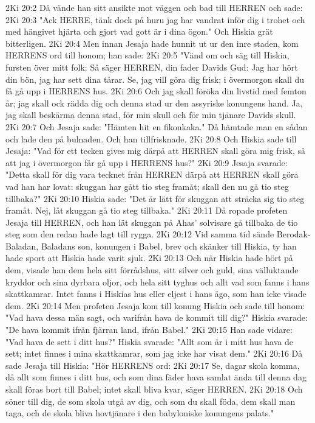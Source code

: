 2Ki 20:2  Då vände han sitt ansikte mot väggen och bad till HERREN och sade:
2Ki 20:3  "Ack HERRE, tänk dock på huru jag har vandrat inför dig i trohet och med hängivet hjärta och gjort vad gott är i dina ögon." Och Hiskia grät bitterligen.
2Ki 20:4  Men innan Jesaja hade hunnit ut ur den inre staden, kom HERRENS ord till honom; han sade:
2Ki 20:5  "Vänd om och säg till Hiskia, fursten över mitt folk: Så säger HERREN, din fader Davids Gud: Jag har hört din bön, jag har sett dina tårar. Se, jag vill göra dig frisk; i övermorgon skall du få gå upp i HERRENS hus.
2Ki 20:6  Och jag skall föröka din livstid med femton år; jag skall ock rädda dig och denna stad ur den assyriske konungens hand. Ja, jag skall beskärma denna stad, för min skull och för min tjänare Davids skull.
2Ki 20:7  Och Jesaja sade: "Hämten hit en fikonkaka." Då hämtade man en sådan och lade den på bulnaden. Och han tillfrisknade.
2Ki 20:8  Och Hiskia sade till Jesaja: "Vad för ett tecken gives mig därpå att HERREN skall göra mig frisk, så att jag i övermorgon får gå upp i HERRENS hus?"
2Ki 20:9  Jesaja svarade: "Detta skall för dig vara tecknet från HERREN därpå att HERREN skall göra vad han har lovat: skuggan har gått tio steg framåt; skall den nu gå tio steg tillbaka?"
2Ki 20:10  Hiskia sade: "Det är lätt för skuggan att sträcka sig tio steg framåt. Nej, låt skuggan gå tio steg tillbaka."
2Ki 20:11  Då ropade profeten Jesaja till HERREN, och han lät skuggan på Ahas' solvisare gå tillbaka de tio steg som den redan hade lagt till rygga.
2Ki 20:12  Vid samma tid sände Berodak-Baladan, Baladans son, konungen i Babel, brev och skänker till Hiskia, ty han hade sport att Hiskia hade varit sjuk.
2Ki 20:13  Och när Hiskia hade hört på dem, visade han dem hela sitt förrådshus, sitt silver och guld, sina välluktande kryddor och sina dyrbara oljor, och hela sitt tyghus och allt vad som fanns i hans skattkamrar. Intet fanns i Hiskias hus eller eljest i hans ägo, som han icke visade dem.
2Ki 20:14  Men profeten Jesaja kom till konung Hiskia och sade till honom: "Vad hava dessa män sagt, och varifrån hava de kommit till dig?" Hiskia svarade: "De hava kommit ifrån fjärran land, ifrån Babel."
2Ki 20:15  Han sade vidare: "Vad hava de sett i ditt hus?" Hiskia svarade: "Allt som är i mitt hus hava de sett; intet finnes i mina skattkamrar, som jag icke har visat dem."
2Ki 20:16  Då sade Jesaja till Hiskia: "Hör HERRENS ord:
2Ki 20:17  Se, dagar skola komma, då allt som finnes i ditt hus, och som dina fäder hava samlat ända till denna dag skall föras bort till Babel; intet skall bliva kvar, säger HERREN.
2Ki 20:18  Och söner till dig, de som skola utgå av dig, och som du skall föda, dem skall man taga, och de skola bliva hovtjänare i den babyloniske konungens palats."
